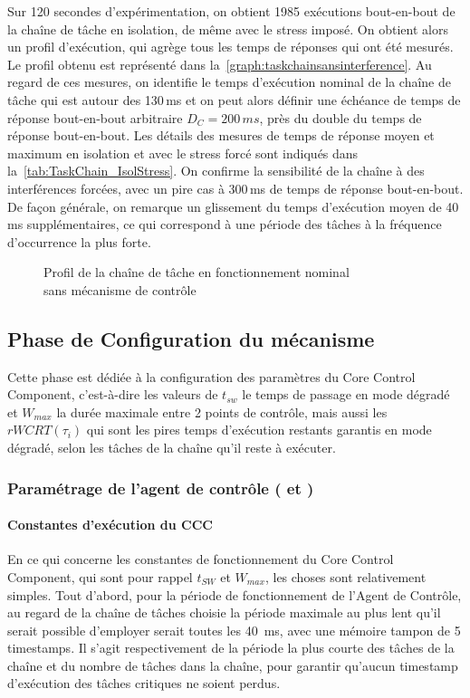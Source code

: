 \documentclass[french, a4paper, 11pt, twoside, pdftex]{StyleThese}
\begin{document}
Sur 120 secondes d'expérimentation, on obtient 1985 exécutions bout-en-bout de la chaîne de tâche en isolation, de même avec le stress imposé. On obtient alors un profil d'exécution, qui agrège tous les temps de réponses qui ont été mesurés. Le profil obtenu est représenté dans la~\autoref{graph:taskchainsansinterference}. Au regard de ces mesures, on identifie le temps d'exécution nominal de la chaîne de tâche qui est autour des 130\,ms et on peut alors définir une échéance de temps de réponse bout-en-bout arbitraire $D_C = 200\,ms$, près du double du temps de réponse bout-en-bout. Les détails des mesures de temps de réponse moyen et maximum en isolation et avec le stress forcé sont indiqués dans la~\autoref{tab:TaskChain_IsolStress}. On confirme la sensibilité de la chaîne à des interférences forcées, avec un pire cas à 300\,ms de temps de réponse bout-en-bout. De façon générale, on remarque un glissement du temps d'exécution moyen de 40\,ms supplémentaires, ce qui correspond à une période des tâches à la fréquence d’occurrence la plus forte.

\begin{figure}[ht]
	\centering
	\scalebox{0.9}{}
	\captionsetup{justification=centering}
	\caption{Profil de la chaîne de tâche en fonctionnement nominal \\ sans mécanisme de contrôle}
	\label{graph:taskchainsansinterference}
\end{figure}

\subsection{Phase de Configuration du mécanisme}

Cette phase est dédiée à la configuration des paramètres du Core Control Component, c'est-à-dire les valeurs de $t_{sw}$ le temps de passage en mode dégradé et $W_{max}$ la durée maximale entre 2 points de contrôle, mais aussi les $rWCRT(\tau_i)$ qui sont les pires temps d'exécution restants garantis en mode dégradé, selon les tâches de la chaîne qu'il reste à exécuter.

\subsubsection{Paramétrage de l'agent de contrôle ( et )}

\paragraph{Constantes d'exécution du CCC}
En ce qui concerne les constantes de fonctionnement du Core Control Component, qui sont pour rappel $t_{SW}$ et $W_{max}$, les choses sont relativement simples. Tout d'abord, pour la période de fonctionnement de l'Agent de Contrôle, au regard de la chaîne de tâches choisie la période maximale au plus lent qu'il serait possible d'employer serait toutes les 40~ms, avec une mémoire tampon de 5 timestamps. Il s'agit respectivement de la période la plus courte des tâches de la chaîne et du nombre de tâches dans la chaîne, pour garantir qu'aucun timestamp d'exécution des tâches critiques ne soient perdus.
\end{document}

